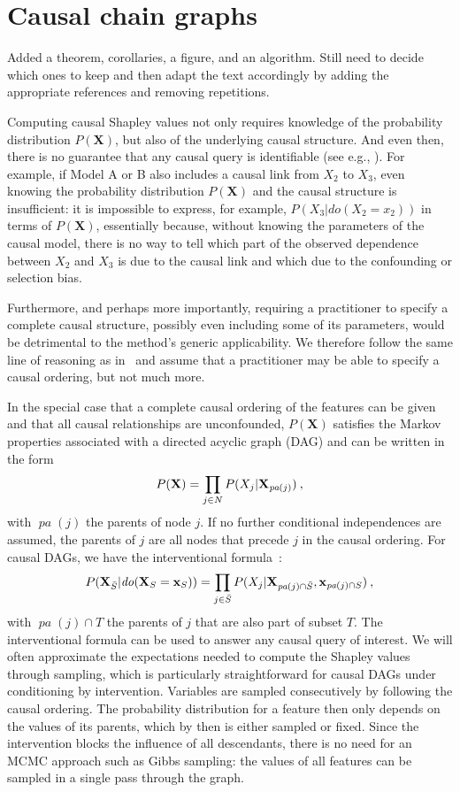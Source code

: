 \documentclass{article}
\newcommand{\vX}{\mathbf{X}}
\newcommand{\vx}{\mathbf{x}}
\newcommand{\dodo}{\mathit{do}}
\newcommand{\ldo}[1]{\dodo(X_{#1} = x_{#1})}
\newcommand{\lvdo}[1]{\dodo(\vX_{#1} = \vx_{#1})}
\newcommand{\pa}{\mathop{\textit{pa}}}
\newcommand{\spa}{\mathop{\textit{\scriptsize pa}}}
\newcommand{\allfeatures}{{N}}
\newcommand{\comment}[1]{{\color{red} #1}}
\begin{document}
\section{Causal chain graphs}

\comment{Added a theorem, corollaries, a figure, and an algorithm. Still need to decide which ones to keep and then adapt the text accordingly by adding the appropriate references and removing repetitions.}

Computing causal Shapley values not only requires knowledge of the probability distribution $P(\vX)$, but also of the underlying causal structure. And even then, there is no guarantee that any causal query is identifiable (see e.g., \cite{pearl2012calculus}). For example, if Model A or B also includes a causal link from $X_2$ to $X_3$, even knowing the probability distribution $P(\vX)$ and the causal structure is insufficient: it is impossible to express, for example, $P(X_3|\ldo{2})$ in terms of $P(\vX)$, essentially because, without knowing the parameters of the causal model, there is no way to tell which part of the observed dependence between $X_2$ and $X_3$ is due to the causal link and which due to the confounding or selection bias.

Furthermore, and perhaps more importantly, requiring a practitioner to specify a complete causal structure, possibly even including some of its parameters, would be detrimental to the method's generic applicability. We therefore follow the same line of reasoning as in~\cite{frye2019asymmetric} and assume that a practitioner may be able to specify a causal ordering, but not much more.

In the special case that a complete causal ordering of the features can be given and that all causal relationships are unconfounded, $P(\vX)$ satisfies the Markov properties associated with a directed acyclic graph (DAG) and can be written in the form
\[
P(\vX) = \prod_{j \in \allfeatures} P(X_j|\vX_{\spa(j)}) \: ,
\]
with $\pa(j)$ the parents of node $j$. If no further conditional independences are assumed, the parents of $j$ are all nodes that precede $j$ in the causal ordering. For causal DAGs, we have the interventional formula~\cite{lauritzen2002chain}:
\begin{equation}
P(\vX_{\bar{S}}|\lvdo{S}) = \prod_{j \in \bar{S}} P(X_j|\vX_{\spa(j)  \cap \bar{S}},\vx_{\spa(j) \cap S}) \: ,
\label{eq:interventional}
\end{equation}
with $\pa(j) \cap T$ the parents of $j$ that are also part of subset $T$. The interventional formula can be used to answer any causal query of interest. We will often approximate the expectations needed to compute the Shapley values through sampling, which is particularly straightforward for causal DAGs under conditioning by intervention. Variables are sampled consecutively by following the causal ordering. The probability distribution for a feature then only depends on the values of its parents, which by then is either sampled or fixed. Since the intervention blocks the influence of all descendants, there is no need for an MCMC approach such as Gibbs sampling: the values of all features can be sampled in a single pass through the graph.
\end{document}
